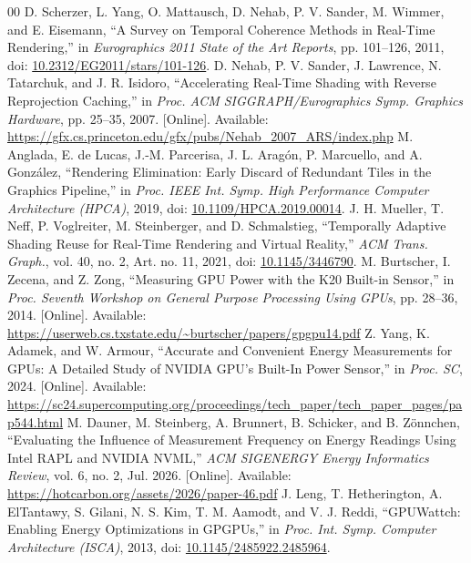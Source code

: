 \documentclass[10pt,conference]{IEEEtran}
\begin{document}
\begin{thebibliography}{00}
 D. Scherzer, L. Yang, O. Mattausch, D. Nehab, P. V. Sander, M. Wimmer, and E. Eisemann, ``A Survey on Temporal Coherence Methods in Real-Time Rendering,'' in \emph{Eurographics 2011 State of the Art Reports}, pp. 101--126, 2011, doi: \href{https://doi.org/10.2312/EG2011/stars/101-126}{10.2312/EG2011/stars/101-126}.
 D. Nehab, P. V. Sander, J. Lawrence, N. Tatarchuk, and J. R. Isidoro, ``Accelerating Real-Time Shading with Reverse Reprojection Caching,'' in \emph{Proc. ACM SIGGRAPH/Eurographics Symp. Graphics Hardware}, pp. 25--35, 2007. [Online]. Available: \url{https://gfx.cs.princeton.edu/gfx/pubs/Nehab_2007_ARS/index.php}
 M. Anglada, E. de Lucas, J.-M. Parcerisa, J. L. Arag\'on, P. Marcuello, and A. Gonz\'alez, ``Rendering Elimination: Early Discard of Redundant Tiles in the Graphics Pipeline,'' in \emph{Proc. IEEE Int. Symp. High Performance Computer Architecture (HPCA)}, 2019, doi: \href{https://doi.org/10.1109/HPCA.2019.00014}{10.1109/HPCA.2019.00014}.
 J. H. Mueller, T. Neff, P. Voglreiter, M. Steinberger, and D. Schmalstieg, ``Temporally Adaptive Shading Reuse for Real-Time Rendering and Virtual Reality,'' \emph{ACM Trans. Graph.}, vol. 40, no. 2, Art. no. 11, 2021, doi: \href{https://doi.org/10.1145/3446790}{10.1145/3446790}.
 M. Burtscher, I. Zecena, and Z. Zong, ``Measuring GPU Power with the K20 Built-in Sensor,'' in \emph{Proc. Seventh Workshop on General Purpose Processing Using GPUs}, pp. 28--36, 2014. [Online]. Available: \url{https://userweb.cs.txstate.edu/~burtscher/papers/gpgpu14.pdf}
 Z. Yang, K. Adamek, and W. Armour, ``Accurate and Convenient Energy Measurements for GPUs: A Detailed Study of NVIDIA GPU's Built-In Power Sensor,'' in \emph{Proc. SC}, 2024. [Online]. Available: \url{https://sc24.supercomputing.org/proceedings/tech_paper/tech_paper_pages/pap544.html}
 M. Dauner, M. Steinberg, A. Brunnert, B. Schicker, and B. Z\"onnchen, ``Evaluating the Influence of Measurement Frequency on Energy Readings Using Intel RAPL and NVIDIA NVML,'' \emph{ACM SIGENERGY Energy Informatics Review}, vol. 6, no. 2, Jul. 2026. [Online]. Available: \url{https://hotcarbon.org/assets/2026/paper-46.pdf}
 J. Leng, T. Hetherington, A. ElTantawy, S. Gilani, N. S. Kim, T. M. Aamodt, and V. J. Reddi, ``GPUWattch: Enabling Energy Optimizations in GPGPUs,'' in \emph{Proc. Int. Symp. Computer Architecture (ISCA)}, 2013, doi: \href{https://doi.org/10.1145/2485922.2485964}{10.1145/2485922.2485964}.

\end{thebibliography}
\end{document}
